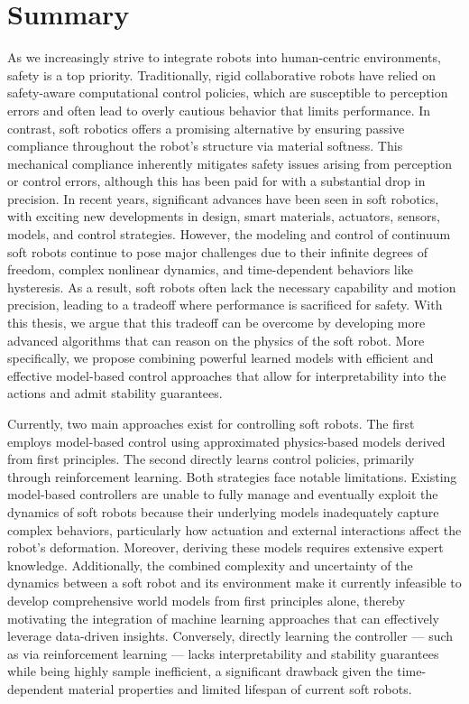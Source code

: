 \chapter*{Summary}
As we increasingly strive to integrate robots into human-centric environments, safety is a top priority. Traditionally, rigid collaborative robots have relied on safety-aware computational control policies, which are susceptible to perception errors and often lead to overly cautious behavior that limits performance. In contrast, soft robotics offers a promising alternative by ensuring passive compliance throughout the robot’s structure via material softness. This mechanical compliance inherently mitigates safety issues arising from perception or control errors, although this has been paid for with a substantial drop in precision. In recent years, significant advances have been seen in soft robotics, with exciting new developments in design, smart materials, actuators, sensors, models, and control strategies. However, the modeling and control of continuum soft robots continue to pose major challenges due to their infinite degrees of freedom, complex nonlinear dynamics, and time-dependent behaviors like hysteresis. As a result, soft robots often lack the necessary capability and motion precision, leading to a tradeoff where performance is sacrificed for safety. With this thesis, we argue that this tradeoff can be overcome by developing more advanced algorithms that can reason on the physics of the soft robot. More specifically, we propose combining powerful learned models with efficient and effective model-based control approaches that allow for interpretability into the actions and admit stability guarantees.

Currently, two main approaches exist for controlling soft robots. The first employs model-based control using approximated physics-based models derived from first principles. The second directly learns control policies, primarily through reinforcement learning. Both strategies face notable limitations. Existing model-based controllers are unable to fully manage and eventually exploit the dynamics of soft robots because their underlying models inadequately capture complex behaviors, particularly how actuation and external interactions affect the robot’s deformation. Moreover, deriving these models requires extensive expert knowledge. Additionally, the combined complexity and uncertainty of the dynamics between a soft robot and its environment make it currently infeasible to develop comprehensive world models from first principles alone, thereby motivating the integration of machine learning approaches that can effectively leverage data-driven insights. Conversely, directly learning the controller — such as via reinforcement learning — lacks interpretability and stability guarantees while being highly sample inefficient, a significant drawback given the time-dependent material properties and limited lifespan of current soft robots.

